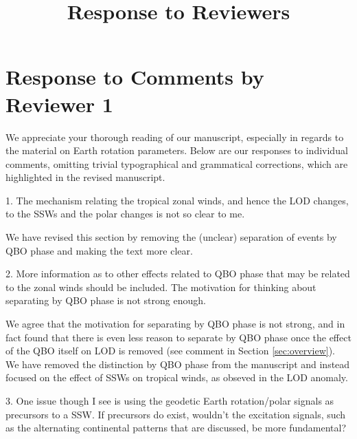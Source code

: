 \documentclass[a4paper,10pt]{article}
\title{Response to Reviewers}
\author{}
\begin{document}
%



\maketitle





\section{Response to Comments by Reviewer 1}
\label{sec:R1}

We appreciate your thorough reading of our manuscript, especially in regards to the material on Earth rotation parameters.
Below are our responses to individual comments, omitting trivial typographical and grammatical corrections, which are highlighted in the revised manuscript.
\vspace{0.5cm}

\noindent \textcolor{reviewer}{1. The mechanism relating the tropical zonal winds, and hence the LOD changes, to the SSWs and the polar changes is not so clear to me.}
\vspace{0.5cm}

We have revised this section by removing the (unclear) separation of events by QBO phase and making the text more clear.
\vspace{0.5cm}

\noindent \textcolor{reviewer}{2. More information as to other effects related to QBO phase that may be related to the zonal winds should be included. The motivation for thinking about separating by QBO phase is not strong enough.}
\vspace{0.5cm}


We agree that the motivation for separating by QBO phase is not strong, and in fact found that there is even less reason to separate by QBO phase once the effect of the QBO itself on LOD is removed (see comment in Section \ref{sec:overview}).  We have removed the distinction by QBO phase from the manuscript and instead focused on the effect of SSWs on tropical winds, as obseved in the LOD anomaly.
\vspace{0.5cm}


\noindent \textcolor{reviewer}{3. One issue though I see is using the geodetic Earth rotation/polar signals as precursors to a SSW. If precursors do exist, wouldn't the excitation signals, such as the alternating continental patterns that are discussed, be more fundamental?}
\vspace{0.5cm}
\end{document}
